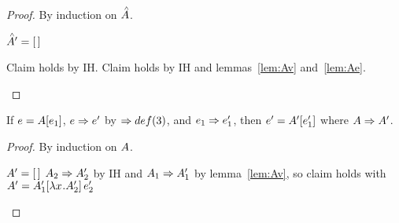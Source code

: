\documentclass{article}
\begin{document}
\begin{proof}
By induction on $\Ap$.
\begin{byCases}
  \case{\Ap = \hole} $\Ap' = \hole$
  \begin{byCases}
    \renewcommand{\byCasesCaseTemplate}[1]{\textbf{Subcase {#1}.}}
    \case{\A = \hole} Claim holds by IH.
    Claim holds by IH and lemmas~\ref{lem:Av} and~\ref{lem:Ae}.
  \end{byCases}
\end{byCases}
\end{proof}

\begin{lemma}
\label{lem:Ae}
If $e = \inA{\e_1}$, $\e \pstep \e'$ by $\pstep def(3)$, and $\e_1 \pstep
\e_1'$, then $\e' = \inA[']{\e_1'}$ where $\A \pstep \A'$.
\end{lemma}

\begin{proof}
By induction on $\A$.
\begin{byCases}
  \case{\A = \hole} $\A' = \hole$
   $\A_2 \pstep \A_2'$ by IH and 
  $\A_1 \pstep \A_1'$ by lemma~\ref{lem:Av}, so claim holds with 
  $\A' = \ap{\inA[_1']{\lx\A_2'}}{\e_2'}$
\end{byCases}
\end{proof}
\end{document}
